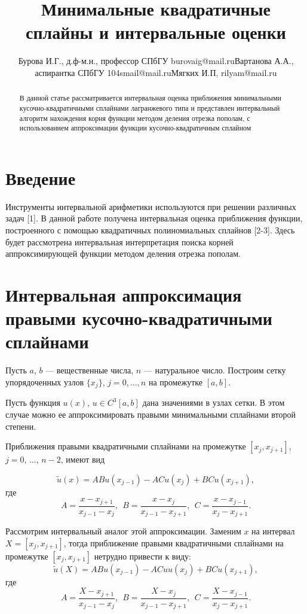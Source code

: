 \documentclass{spisok-article}
\title{Минимальные квадратичные сплайны и интервальные оценки}
\author{Бурова И.Г., д.ф-м.н., профессор СПбГУ burovaig@mail.ru\newline{}Вартанова А.А., аспирантка СПбГУ 104smail@mail.ru\newline{}Мягких И.П, rilyam@mail.ru}
\begin{document}
\maketitle

\begin{abstract}
%
В данной статье рассматривается интервальная оценка приближения
 минимальными кусочно-квадратичными  сплайнами лагранжевого типа  и представлен
  интервальный алгоритм  нахождения корня функции методом деления отрезка пополам, с использованием аппроксимации функции кусочно-квадратичным сплайном
\end{abstract}

\section{Введение}

Инструменты интервальной арифметики используются при решении различных задач [1]. В данной работе получена интервальная оценка  приближения функции, построенного с помощью квадратичных полиномиальных сплайнов [2-3]. Здесь будет рассмотрена интервальная интерпретация поиска корней аппроксимирующей функции методом деления отрезка пополам.

\section{Интервальная аппроксимация правыми кусочно-квадратичными сплайнами}

Пусть $a$, $b$ --- вещественные числа, $n$ --- натуральное число. Построим сетку упорядоченных узлов
$\{ x_j \}$, $j=0,\ldots,n$   на промежутке $[a,b]$.

Пусть функция $u(x)$, $u\in C^3[a,b]$ дана значениями в узлах сетки.
В этом случае можно ее  аппроксимировать
 правыми минимальными сплайнами второй степени.

 Приближения правыми квадратичными сплайнами на
промежутке $[x_j, x_{j+1}]$,  $j=0$, $\ldots$, $n-2$, имеют вид

$$\widetilde{u}(x)=ABu(x_{j-1}) -ACu(x_{j})+BCu(x_{j+1}), $$
где $$A=\frac{x-x_{j+1}}{  x_{j-1}-x_{j}} , \ \
B=\frac{x-x_{j} }{ x_{j-1}-x_{j+1}}, \ \
 C=\frac{x-x_{j-1}}{  x_{j}-x_{j+1}}.$$



 Рассмотрим интервальный аналог этой аппроксимации. Заменим  $x$ на интервал
  $X=[x_j, x_{j+1}]$,  тогда приближение правыми квадратичными
  сплайнами на промежутке $[x_j, x_{j+1}]$   нетрудно привести к виду:
		$$\widetilde{u}(X)=ABu(x_{j-1}) -ACuu(x_{j})+BCu(x_{j+1}), $$
где $$A=\frac{X-x_{j+1}}{  x_{j-1}-x_{j}} , \ \
B=\frac{X-x_{j} }{ x_{j-1}-x_{j+1}}, \ \
 C=\frac{X-x_{j-1}}{  x_{j}-x_{j+1}}.$$
\end{document}
